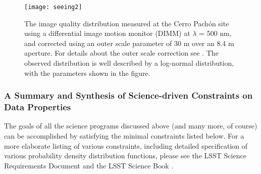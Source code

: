 
\begin{figure}
\texttt{[image: seeing2]}
\caption{
The image quality distribution measured at the Cerro Pach\'{o}n site using
a differential image motion monitor (DIMM) at $\lambda$ = 500 nm, and corrected
using an outer scale parameter of 30 m over an 8.4 m aperture. For details
about the outer scale correction see \citet{2002PASP..114.1156T}. The observed distribution
is well described by a log-normal distribution, with the parameters shown in
the figure.}
\label{Fig:seeing}
\end{figure}

\subsubsection{A Summary and Synthesis of Science-driven Constraints on Data Properties}

The goals of all the science programs discussed above
(and many more, of course) can be accomplished by satisfying the
minimal constraints listed below. For a more elaborate listing
of various constraints, including detailed specification of
various probability density distribution functions, please see the LSST Science
Requirements Document \citep{LPM-17}
and the LSST Science Book \citep{2009arXiv0912.0201L}.

